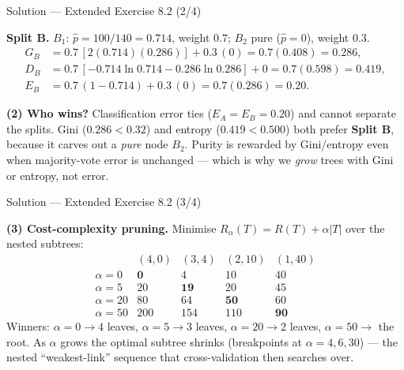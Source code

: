 \documentclass[aspectratio=169,11pt]{beamer}
\begin{document}
\begin{frame}{Solution --- Extended Exercise 8.2 (2/4)}
\begin{solutionbox}
\textbf{Split B.} $B_1$: $\hat p=100/140=0.714$, weight $0.7$; $B_2$ pure ($\hat p=0$), weight $0.3$.
\begin{align*}
G_B&=0.7\,[2(0.714)(0.286)]+0.3\,(0)=0.7(0.408)=\mathbf{0.286},\\
D_B&=0.7\,[-0.714\ln0.714-0.286\ln0.286]+0=0.7(0.598)=\mathbf{0.419},\\
E_B&=0.7\,(1-0.714)+0.3\,(0)=0.7(0.286)=\mathbf{0.20}.
\end{align*}

\medskip
\textbf{(2) Who wins?} Classification error ties ($E_A=E_B=0.20$) and cannot separate the splits. Gini ($0.286<0.32$) and entropy ($0.419<0.500$) both prefer \textbf{Split B}, because it carves out a \emph{pure} node $B_2$. Purity is rewarded by Gini/entropy even when majority-vote error is unchanged --- which is why we \emph{grow} trees with Gini or entropy, not error.
\end{solutionbox}
\end{frame}

\begin{frame}{Solution --- Extended Exercise 8.2 (3/4)}
\begin{solutionbox}
\textbf{(3) Cost-complexity pruning.} Minimise $R_\alpha(T)=R(T)+\alpha|T|$ over the nested subtrees:
\[
\begin{array}{c|cccc}
 & (4,0) & (3,4) & (2,10) & (1,40)\\\hline
\alpha{=}0 & \mathbf{0} & 4 & 10 & 40\\
\alpha{=}5 & 20 & \mathbf{19} & 20 & 45\\
\alpha{=}20 & 80 & 64 & \mathbf{50} & 60\\
\alpha{=}50 & 200 & 154 & 110 & \mathbf{90}
\end{array}
\]
Winners: $\alpha{=}0\!\to\!4$ leaves, $\alpha{=}5\!\to\!3$ leaves, $\alpha{=}20\!\to\!2$ leaves, $\alpha{=}50\!\to\!$ the root. As $\alpha$ grows the optimal subtree shrinks (breakpoints at $\alpha=4,6,30$) --- the nested ``weakest-link'' sequence that cross-validation then searches over.
\end{solutionbox}
\end{frame}
\end{document}
